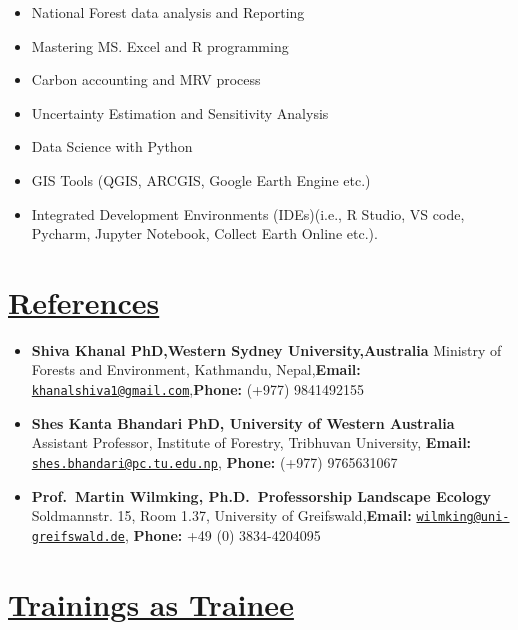 \documentclass[
]{article}
\providecommand{\tightlist}{%
  \setlength{\itemsep}{0pt}\setlength{\parskip}{0pt}}
\begin{document}
\begin{itemize}
\tightlist
\item
  National Forest data analysis and Reporting
\item
  Mastering MS. Excel and R programming
\item
  Carbon accounting and MRV process
\item
  Uncertainty Estimation and Sensitivity Analysis
\item
  Data Science with Python
\item
  GIS Tools (QGIS, ARCGIS, Google Earth Engine etc.)
\item
  Integrated Development Environments (IDEs)(i.e., R Studio, VS code,
  Pycharm, Jupyter Notebook, Collect Earth Online etc.).
\end{itemize}

\section{\texorpdfstring{\underline{References}}{}}\label{section-6}

\begin{itemize}
\item
  \textbf{Shiva Khanal PhD,Western Sydney University,Australia} Ministry
  of Forests and Environment, Kathmandu, Nepal,\textbf{Email:}
  \href{mailto:khanalshiva1@gmail.com}{\nolinkurl{khanalshiva1@gmail.com}},\textbf{Phone:}
  (+977) 9841492155
\item
  \textbf{Shes Kanta Bhandari PhD, University of Western Australia}
  Assistant Professor, Institute of Forestry, Tribhuvan University,
  \textbf{Email:}
  \href{mailto:shes.bhandari@pc.tu.edu.np}{\nolinkurl{shes.bhandari@pc.tu.edu.np}},
  \textbf{Phone:} (+977) 9765631067
\item
  \textbf{Prof.~Martin Wilmking, Ph.D.~Professorship Landscape Ecology}
  Soldmannstr. 15, Room 1.37, University of Greifswald,\textbf{Email:}
  \href{mailto:wilmking@uni-greifswald.de}{\nolinkurl{wilmking@uni-greifswald.de}},
  \textbf{Phone:} +49 (0) 3834-4204095
\end{itemize}

\newpage

\section{\texorpdfstring{\underline{Trainings as Trainee}}{}}\label{section-7}
\end{document}
